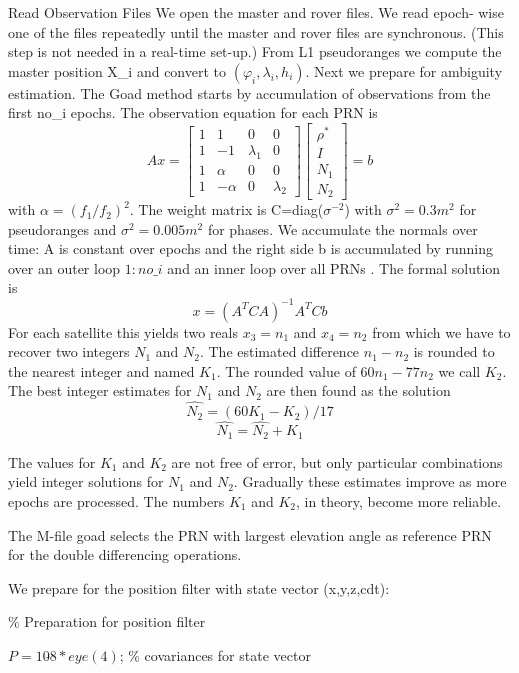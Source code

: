 Read Observation Files We open the master and rover files. We read epoch- wise one of the files repeatedly until the master and rover files are synchronous. (This step is not needed in a real-time set-up.) From L1 pseudoranges we compute the master position X\_i and convert to $(\varphi_{i},\lambda_{i},h_{i})$. Next we prepare for ambiguity estimation. The Goad method starts by accumulation of observations from the first no\_i epochs. The observation equation for each PRN is
$$
Ax=
\begin{bmatrix}
1&1&0&0\\
1&-1&\lambda_{1}&0\\
1&\alpha&0&0\\
1&-\alpha&0&\lambda_{2}
\end{bmatrix}
\begin{bmatrix}
\rho^{*}\\
I\\
N_{1}\\
N_{2}
\end{bmatrix}
=b
$$
with $\alpha=(f_{1}/f_{2})^{2}$. The weight matrix is C=diag($\sigma^{-2}$) with $\sigma^{2}=0.3m^{2}$ for pseudoranges and $\sigma^{2}=0.005m^{2}$ for phases. We accumulate the normals over time: A is constant over epochs and the right side b is accumulated by running over an outer loop $1:no\_i$ and an inner loop over all PRNs . The formal solution is
$$
x=(A^{T}CA)^{-1}A^{T}Cb
$$
For each satellite this yields two reals $x_{3}=n_{1}$ and $x_{4}=n_{2}$ from which we have to recover two integers $N_{1}$ and $N_{2}$. The estimated difference $n_{1}-n_{2}$ is rounded to the nearest integer and named $K_{1}$. The rounded value of $60n_{1}-77n_{2}$ we call $K_{2}$. The best integer estimates for $N_{1}$ and $N_{2}$ are then found as the solution
$$
\hat{N_{2}}=(60K_{1}-K_{2})/17
$$
$$
\hat{N_{1}}=\hat{N_{2}}+K_{1}
$$

The values for $K_{1}$ and $K_{2}$ are not free of error, but only particular combinations yield integer solutions for $N_{1}$ and $N_{2}$. Gradually these estimates improve as more epochs
are processed. The numbers $K_{1}$ and $K_{2}$, in theory, become more reliable.

The M-file goad selects the PRN with largest elevation angle as reference PRN for
the double differencing operations.

We prepare for the position filter with state vector (x,y,z,cdt):

\% Preparation for position filter

$P = 10\hat{} 8 * eye(4)$;                  \% covariances for state vector

